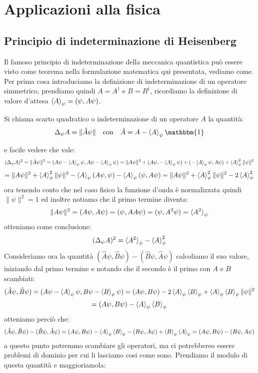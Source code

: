 \chapter{Applicazioni alla fisica}
\section{Principio di indeterminazione di Heisenberg}
Il famoso principio di indeterminazione della meccanica quantistica può essere visto come teorema nella formulazione matematica qui presentata, vediamo come. Per prima cosa introduciamo la definizione di indeterminazione di un operatore simmetrico, prendiamo quindi $A=A^\dagger$ e $B=B^\dagger$, ricordiamo la definizione di valore d'attesa $\braket{A}_\psi = (\psi,A\psi)$.
\begin{dfn}
Si chiama scarto quadratico o indeterminazione di un operatore $A$ la quantità:
\[\Delta_\psi A = \|\hat{A}\psi\| \quad\text{con}\quad \hat{A} = A-\braket{A}_\psi\mathbbm{1}\]
\end{dfn}
e facile vedere che vale:
\[(\Delta_\psi A)^2 = \|\hat{A}\psi\|^2 = (A\psi-\braket{A}_\psi \psi,A\psi-\braket{A}_\psi \psi) = \|A\psi\|^2 + (A\psi,-\braket{A}_\psi \psi) + (-\braket{A}_\psi \psi,A\psi) + \braket{A}_\psi^2\|\psi\|^2\]
\[ = \|A\psi\|^2 +  \braket{A}_\psi^2\|\psi\|^2 - \braket{A}_\psi (A\psi,\psi) - \braket{A}_\psi (\psi,A\psi) = \|A\psi\|^2 +  \braket{A}_\psi^2\|\psi\|^2 -2\braket{A}_\psi^2 \]
ora tenendo conto che nel caso fisico la funzione d'onda è normalizzata quindi $\|\psi\|^2 = 1$ ed inoltre notiamo che il primo termine diventa:
\[\|A\psi\|^2 = (A\psi,A\psi) = (\psi,AA\psi) = (\psi,A^2\psi) = \braket{A^2}_\psi\]
otteniamo come conclusione:
\[(\Delta_\psi A)^2 =\braket{A^2}_\psi -\braket{A}_\psi^2 \]
Consideriamo ora la quantità $(\hat{A}\psi,\hat{B}\psi) - (\hat{B}\psi,\hat{A}\psi)$ calcoliamo il suo valore, iniziando dal primo termine e notando che il secondo è il primo con $A$ e $B$ scambiati:
\[(\hat{A}\psi,\hat{B}\psi)  = (A\psi-\braket{A}_\psi\psi,B\psi-\braket{B}_\psi\psi) = (A\psi,B\psi) - 2\braket{A}_\psi\braket{B}_\psi + \braket{A}_\psi\braket{B}_\psi \|\psi\|^2\]
\[= (A\psi,B\psi) - \braket{A}_\psi\braket{B}_\psi \]
otteniamo perciò che:
\[(\hat{A}\psi,\hat{B}\psi) - (\hat{B}\psi,\hat{A}\psi) =(A\psi,B\psi) - \braket{A}_\psi\braket{B}_\psi - (B\psi,A\psi) + \braket{B}_\psi\braket{A}_\psi = (A\psi,B\psi) -(B\psi,A\psi) \]
a questo punto potremmo scambiare gli operatori, ma ci potrebbereo essere problemi di dominio per cui li lasciamo cosi come sono. Prendiamo il modulo di questa quantità e maggioriamola:
